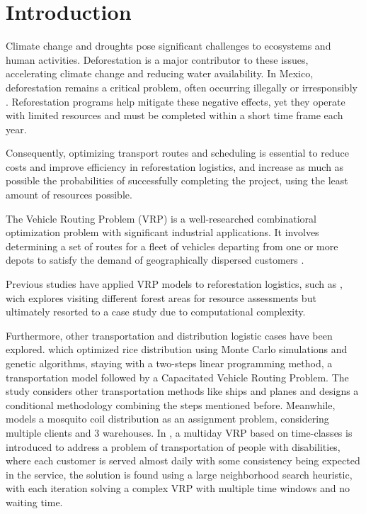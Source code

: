 \documentclass{amsart}
\begin{document}

    \section{Introduction}
        Climate change and droughts pose significant challenges to ecosystems and human activities. Deforestation is a major contributor to these issues, accelerating climate change and reducing water availability. In Mexico, deforestation remains a critical problem, often occurring illegally or irresponsibly \parencite{WRI2023}. Reforestation programs help mitigate these negative effects, yet they operate with limited resources and must be completed within a short time frame each year.

         Consequently, optimizing transport routes and scheduling is essential to reduce costs and improve efficiency in reforestation logistics, and increase as much as possible the probabilities of successfully completing the project, using the least amount of resources possible.
         
         The Vehicle Routing Problem (VRP) is a well-researched combinatioral optimization problem with significant industrial applications. It involves determining a set of routes for a fleet of vehicles departing from one or more depots to satisfy the demand of geographically dispersed customers \parencite{Sarmiento2014}.
         
         Previous studies have applied VRP models to reforestation logistics, such as \cite{VRPReforestation}, wich explores visiting different forest areas for resource assessments but ultimately resorted to a case study due to computational complexity. 
         
         Furthermore, other transportation and distribution logistic cases have been explored. \cite{Nurprihatin2021} which optimized rice distribution using Monte Carlo simulations and genetic algorithms, staying with a two-steps linear programming method, a transportation model followed by a Capacitated Vehicle Routing Problem. The study considers other transportation methods like ships and planes and designs a conditional methodology combining the steps mentioned before. Meanwhile, \cite{Khan2014} models a mosquito coil distribution as an assignment problem, considering multiple clients and 3 warehouses. In \cite{Feillet2014}, a multiday VRP based on time-classes is introduced to address a problem of transportation of people with disabilities, where each customer is served almost daily with some consistency being expected in the service, the solution is found using a large neighborhood search heuristic, with each iteration solving a complex VRP with multiple time windows and no waiting time.
      
\end{document}

